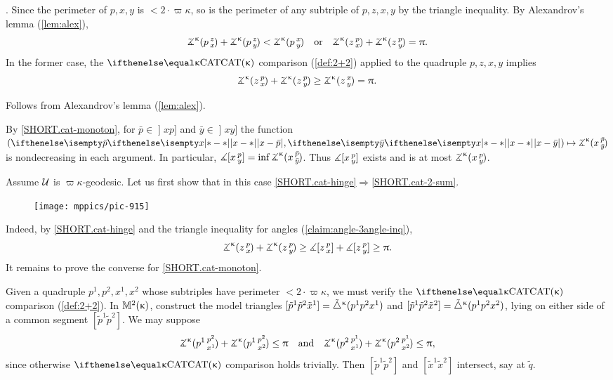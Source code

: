 . 
Since the perimeter of $p,x,y$ is $<2\cdot \varpi\kappa$, so is the perimeter of any subtriple of $p,z,x,y$ by the triangle inequality. 
By Alexandrov's lemma (\ref{lem:alex}), 
\[\angk\kappa p z x +\angk\kappa p z y  < \angk{\kappa} p x y \quad \text{or}\quad  \angk\kappa z p x  +\angk\kappa z p y  =\pi.\]
In the former case, the $\CAT\kappa$ comparison (\ref{def:2+2}) applied to the quadruple $p, z, x, y$ implies
\[\angk\kappa z p x  +\angk\kappa z p y  \ge \angk{\kappa} z x y =\pi.\]

Follows from  Alexandrov's lemma (\ref{lem:alex}).

By \ref{SHORT.cat-monoton}, for $\bar p\in\mathopen{]}x p]$ and $\bar y\in\mathopen{]}x y]$ the function $(\dist{x}{\bar p}{},\dist{x}{\bar y}{})\mapsto\angk\kappa x{\bar p}{\bar y}$ is nondecreasing in each argument.
In particular, 
$\mangle\hinge x p y\z=\inf\angk\kappa x{\bar p}{\bar y}$.
Thus $\measuredangle[x\,{}^{p}_{y}]$ exists and is
at most $\angk\kappa x p y$. 

 Assume $\mathcal{U}$ is $\varpi\kappa$-geodesic. 
Let us first show that in this case \ref{SHORT.cat-hinge}$\Rightarrow$\ref{SHORT.cat-2-sum}.

\begin{wrapfigure}{r}{30 mm}
\vskip-4mm
\centering
\texttt{[image: mppics/pic-915]}
\end{wrapfigure}

Indeed, by \ref{SHORT.cat-hinge} and the triangle inequality for angles (\ref{claim:angle-3angle-inq}),
\[\angk\kappa z p x
+\angk\kappa z p y \ge \mangle\hinge z p x
+\mangle\hinge z p y \ge \pi.\]
It remains to prove the converse for \ref{SHORT.cat-monoton}.

Given a quadruple  $p^1,p^2,x^1,x^2$ whose subtriples have perimeter $<2\cdot\varpi\kappa$, we must verify the $\CAT\kappa$ comparison (\ref{def:2+2}).
In $\mathbb{M}_{{}}^{2}({\upkappa})$, construct the model triangles  $[{\tilde p^1}{\tilde p^2}{\tilde x^1}] = {\tilde\triangle}^{\upkappa}(p^1 p^2 x^1 )$ 
and $\trig{\tilde p^1}{\tilde p^2}{\tilde x^2}\z= \modtrig\kappa(p^1 p^2 x^2)$, lying on either side of a common segment $[\tilde p^1 \tilde p^2]$.
We may suppose 
\[\angk{\kappa} {p^1}{p^2}{x^1}+\angk{\kappa} {p^1}{p^2}{x^2}
\le
\pi
\quad \text{and}\quad 
\angk{\kappa}{p^2}{p^1}{x^1}+\angk{\kappa} {p^2}{p^1}{x^2}
\le 
\pi,\] 
since otherwise $\CAT\kappa$ comparison holds trivially.  
Then $[\tilde p^1 \tilde p^2]$ and $[\tilde x^1 \tilde x^2]$ intersect, say at $\tilde q$.  

